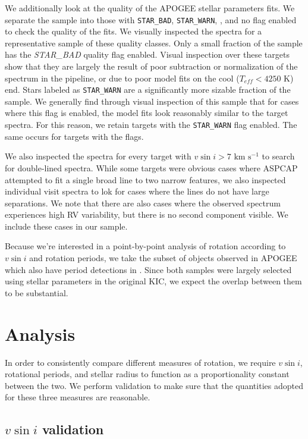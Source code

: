 \documentclass[manuscript]{aastex6}
\newcommand{\vsini}{\ensuremath{v \sin i}}
\newcommand{\Teff}{\ensuremath{T_{eff}}}
\newcommand{\kms}{\textrm{ km~s}\ensuremath{^{-1}}}
\newcommand{\STARBAD}{\texttt{STAR\_BAD}}
\newcommand{\STARWARN}{\texttt{STAR\_WARN}}
\newcommand{\VSINIWARN}{\textt{VSINI\_WARN}}
\newcommand{\gvs}{\authorcomment1}
\begin{document}
We additionally look at the quality of the APOGEE stellar parameters
fits. We separate the sample into those with \STARBAD, \STARWARN,
\VSINIWARN, and no flag enabled to check the quality of the fits. We
visually inspected the spectra for a representative sample of these
quality classes. Only a small fraction of the sample has the \textit{STAR\_BAD} quality flag enabled. 
Visual inspection over these targets show that they are largely
the result of poor subtraction or normalization of the spectrum in the
pipeline, or due to poor model fits on the cool (\(\Teff < 4250\) K) end. 
Stars labeled as \STARWARN{} are a significantly more sizable fraction
of the sample.
We generally find through visual inspection of this sample that for cases where this flag is enabled, the model fits look 
reasonably similar to the target spectra. For this reason, we retain targets
with the \STARWARN{} flag enabled. The same occurs for targets with the
\VSINIWARN flags.

We also inspected the spectra for every target with \(\vsini > 7 \kms\)
to search for double-lined spectra. While some targets were obvious
cases where ASPCAP attempted to fit a single broad line to two narrow
features, we also inspected individual visit spectra to lok for cases
where the lines do not have large separations. We note that there are
also cases where the observed spectrum experiences high RV variability,
but there is no second component visible. We include these cases in our
sample.

Because we're interested in a point-by-point analysis of rotation according to
\vsini{} and rotation periods, we take the subset of \gvs{around 550} objects
observed in APOGEE which also have period detections in \citet{McQuillan14}.
Since both samples were largely selected using stellar parameters in the
original KIC, we expect the overlap between them to be substantial.



\section{Analysis}
\label{sec:analysis}

In order to consistently compare different measures of rotation, we require 
\vsini{}, rotational periods, and stellar radius to function as a 
proportionality constant
between the two. We perform validation to make sure that the quantities adopted
for these three measures are reasonable.


\subsection{\vsini{} validation}
\end{document}
